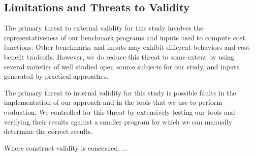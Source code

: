 \subsection{Limitations and Threats to Validity}


The primary threat to external validity 
for this study involves the representativeness 
of our benchmark programs and inputs used
to compute cost functions.
Other benchmarks and inputs may exhibit different 
behaviors and cost-benefit tradeoffs.
However, we do reduce this threat to some extent by
using several varieties of well studied open source subjects 
for our study, and inputs generated by practical approaches.

The primary threat to internal validity for this study
is possible faults in the implementation of our approach
and in the tools that we use to perform evaluation.
We controlled for this threat by extensively testing
our tools and verifying their results against a smaller
program for which we can manually determine the correct results.

Where construct validity is concerned, ...

